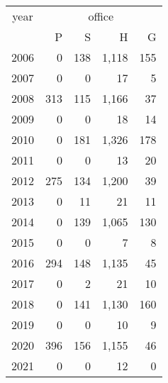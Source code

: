 \footnotesize\begin{tabular}[t]{lrrrr}
\toprule
\multicolumn{1}{c}{year} & \multicolumn{4}{c}{office} \\
\cmidrule(l{3pt}r{3pt}){1-1} \cmidrule(l{3pt}r{3pt}){2-5}
  & P & S & H & G\\
\midrule
2006 & 0 & 138 & 1,118 & 155\\
2007 & 0 & 0 & 17 & 5\\
2008 & 313 & 115 & 1,166 & 37\\
2009 & 0 & 0 & 18 & 14\\
2010 & 0 & 181 & 1,326 & 178\\
2011 & 0 & 0 & 13 & 20\\
2012 & 275 & 134 & 1,200 & 39\\
2013 & 0 & 11 & 21 & 11\\
2014 & 0 & 139 & 1,065 & 130\\
2015 & 0 & 0 & 7 & 8\\
2016 & 294 & 148 & 1,135 & 45\\
2017 & 0 & 2 & 21 & 10\\
2018 & 0 & 141 & 1,130 & 160\\
2019 & 0 & 0 & 10 & 9\\
2020 & 396 & 156 & 1,155 & 46\\
2021 & 0 & 0 & 12 & 0\\
\bottomrule
\end{tabular}
